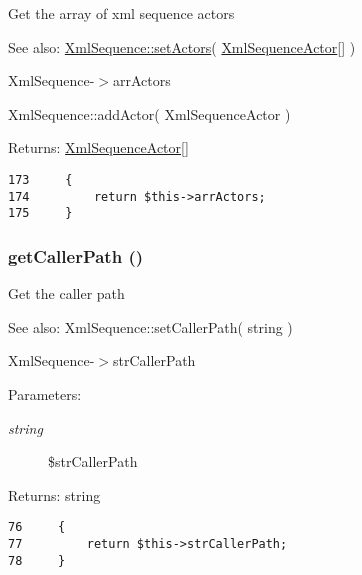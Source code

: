 Get the array of xml sequence actors

\begin{Desc}
\item[See also:]\hyperlink{class_xml_sequence_3ffb44470b89a8f309c8e18159bdac24}{XmlSequence::setActors}( \hyperlink{class_xml_sequence_actor}{XmlSequenceActor}\mbox{[}\mbox{]} ) 

XmlSequence-$>$arrActors 

XmlSequence::addActor( XmlSequenceActor ) \end{Desc}
\begin{Desc}
\item[Returns:]\hyperlink{class_xml_sequence_actor}{XmlSequenceActor}\mbox{[}\mbox{]} \end{Desc}


\begin{Code}\begin{verbatim}173     {
174         return $this->arrActors;
175     }
\end{verbatim}
\end{Code}


\hypertarget{class_xml_sequence_a8c839c9d33ebad153541a31ffc7ef3e}{
\subsubsection[{getCallerPath}]{\setlength{\rightskip}{0pt plus 5cm}getCallerPath ()}}
\label{class_xml_sequence_a8c839c9d33ebad153541a31ffc7ef3e}


Get the caller path

\begin{Desc}
\item[See also:]XmlSequence::setCallerPath( string ) 

XmlSequence-$>$strCallerPath \end{Desc}
\begin{Desc}
\item[Parameters:]
\begin{description}
\item[{\em string}]\$strCallerPath \end{description}
\end{Desc}
\begin{Desc}
\item[Returns:]string \end{Desc}


\begin{Code}\begin{verbatim}76     {
77         return $this->strCallerPath;
78     }
\end{verbatim}
\end{Code}


